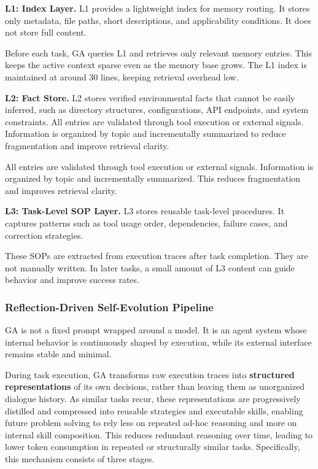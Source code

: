 \textbf{L1: Index Layer.} L1 provides a lightweight index for memory routing. It stores only metadata, file paths, short descriptions, and applicability conditions. It does not store full content.

Before each task, GA queries L1 and retrieves only relevant memory entries. This keeps the active context sparse even as the memory base grows. The L1 index is maintained at around 30 lines, keeping retrieval overhead low.

\textbf{L2: Fact Store.} L2 stores verified environmental facts that cannot be easily inferred, such as directory structures, configurations, API endpoints, and system constraints. All entries are validated through tool execution or external signals. Information is organized by topic and incrementally summarized to reduce fragmentation and improve retrieval clarity.

All entries are validated through tool execution or external signals. Information is organized by topic and incrementally summarized. This reduces fragmentation and improves retrieval clarity.

\textbf{L3: Task-Level SOP Layer.} L3 stores reusable task-level procedures. It captures patterns such as tool usage order, dependencies, failure cases, and correction strategies.

These SOPs are extracted from execution traces after task completion. They are not manually written. In later tasks, a small amount of L3 content can guide behavior and improve success rates.

\subsubsection{Reflection-Driven Self-Evolution Pipeline}
\label{sec:self-evolution}

GA is not a fixed prompt wrapped around a model. It is an agent system whose internal behavior is continuously shaped by execution, while its external interface remains stable and minimal.

During task execution, GA transforms raw execution traces into \textbf{structured representations} of its own decisions, rather than leaving them as unorganized dialogue history. As similar tasks recur, these representations are progressively distilled and compressed into reusable strategies and executable skills, enabling future problem solving to rely less on repeated ad-hoc reasoning and more on internal skill composition. This reduces redundant reasoning over time, leading to lower token consumption in repeated or structurally similar tasks. Specifically, this mechanism consists of three stages.

